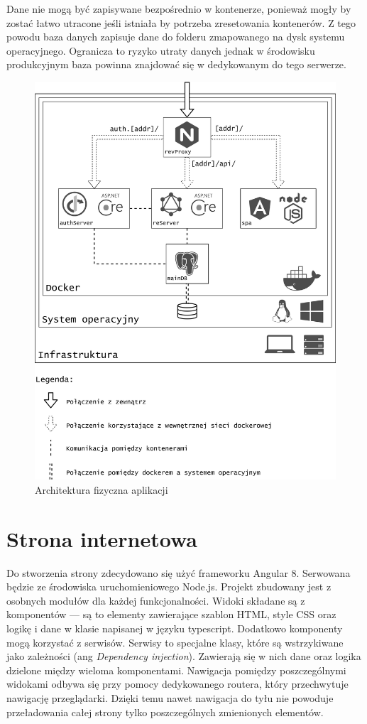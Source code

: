 	Dane nie mogą być zapisywane bezpośrednio w kontenerze, ponieważ mogły by zostać łatwo utracone jeśli istniała by potrzeba zresetowania kontenerów.
	Z tego powodu baza danych zapisuje dane do folderu zmapowanego na dysk systemu operacyjnego.
	Ogranicza to ryzyko utraty danych jednak w środowisku produkcyjnym baza powinna znajdować się w dedykowanym do tego serwerze.

	\begin{figure}[ht]
		\centering
			\includegraphics[width=\linewidth]{rys04/docker.png}
		 \caption{Architektura fizyczna aplikacji}
		 \label{fig:docker}
	\end{figure}

\section{Strona internetowa}
	Do stworzenia strony zdecydowano się użyć frameworku Angular 8.
	Serwowana będzie ze środowiska uruchomieniowego Node.js.
	Projekt zbudowany jest z osobnych modułów dla każdej funkcjonalności.
	Widoki składane są z komponentów --- są to elementy zawierające szablon HTML, style CSS oraz logikę i dane w klasie napisanej w języku typescript.
	Dodatkowo komponenty mogą korzystać z serwisów. Serwisy to specjalne klasy, które są wstrzykiwane jako zależności (ang \emph{Dependency injection}).
	Zawierają się w nich dane oraz logika dzielone między wieloma komponentami.
	Nawigacja pomiędzy poszczególnymi widokami odbywa się przy pomocy dedykowanego routera, który przechwytuje nawigację przeglądarki.
	Dzięki temu nawet nawigacja do tyłu nie powoduje przeładowania całej strony tylko poszczególnych zmienionych elementów.

